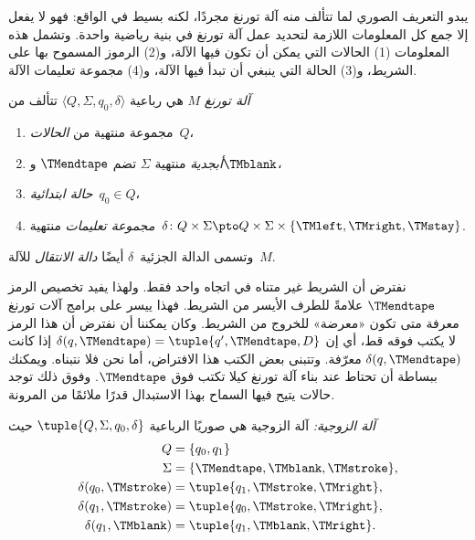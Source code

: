 \documentclass[../../../include/open-logic-section]{subfiles}
\begin{document}

\begin{explain}
يبدو التعريف الصوري لما تتألف منه آلة تورنغ مجردًا، لكنه بسيط في
الواقع: فهو لا يفعل إلا جمع كل المعلومات اللازمة لتحديد عمل آلة
تورنغ في بنية رياضية واحدة. وتشمل هذه المعلومات (1) الحالات التي
يمكن أن تكون فيها الآلة، و(2) الرموز المسموح بها على الشريط، و(3)
الحالة التي ينبغي أن تبدأ فيها الآلة، و(4) مجموعة تعليمات الآلة.
\end{explain}

\begin{defn}
\emph{آلة تورنغ} $M$ هي رباعية $\langle Q,\Sigma,q_0,\delta\rangle$
تتألف من
\begin{enumerate}
\item مجموعة منتهية من \emph{الحالات}~$Q$،
\item \emph{أبجدية} منتهية $\Sigma$ تضم $\TMendtape$ و$\TMblank$،
\item \emph{حالة ابتدائية}~$q_0 \in Q$،
\item \emph{مجموعة تعليمات} منتهية~$\delta\colon Q \times \Sigma
  \pto Q \times \Sigma \times \{\TMleft,\TMright,\TMstay\}$.
\end{enumerate}
وتسمى الدالة الجزئية~$\delta$ أيضًا \emph{دالة الانتقال} للآلة~$M$.
\end{defn}

\begin{explain}
نفترض أن الشريط غير متناه في اتجاه واحد فقط. ولهذا يفيد تخصيص الرمز
$\TMendtape$ علامةً للطرف الأيسر من الشريط. فهذا ييسر على برامج آلات
تورنغ معرفة متى تكون «معرضة» للخروج من الشريط. وكان يمكننا أن نفترض
أن هذا الرمز لا يكتب فوقه قط، أي إن
$\delta(q,\TMendtape)=\tuple{q',\TMendtape,D}$ إذا كانت
$\delta(q,\TMendtape)$ معرّفة. وتتبنى بعض الكتب هذا الافتراض، أما نحن
فلا نتبناه. ويمكنك ببساطة أن تحتاط عند بناء آلة تورنغ كيلا تكتب فوق
$\TMendtape$. وفوق ذلك توجد حالات يتيح فيها السماح بهذا الاستبدال
قدرًا ملائمًا من المرونة.
\end{explain}

\begin{ex}
\emph{آلة الزوجية:} آلة الزوجية هي صوريًا الرباعية
$\tuple{Q,\Sigma,q_0,\delta}$ حيث
\begin{align*}
Q & = \{ q_0, q_1 \} \\
\Sigma & = \{ \TMendtape, \TMblank, \TMstroke \}, \\
\delta(q_0, \TMstroke) & = \tuple{q_1, \TMstroke, \TMright},\\
\delta(q_1, \TMstroke) & = \tuple{q_0, \TMstroke, \TMright},\\
\delta(q_1, \TMblank)  & = \tuple{q_1, \TMblank, \TMright}.
\end{align*}
\end{ex}
\end{document}
